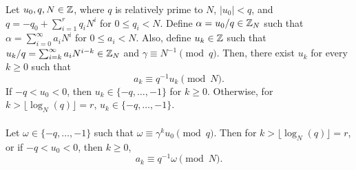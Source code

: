 \begin{theorem}\label{thm:10}
  Let $u_0,q,N\in\mathbb{Z}$, where $q$ is relatively prime to $N$,
  $\lvert u_0 \rvert < q$, and $q=-q_0+\sum_{i=1}^{r}q_iN^i$ for
  $0 \leq q_i < N$. Define $\alpha = u_0/q \in \mathbb{Z}_N$
  such that $\alpha = \sum_{i=0}^{\infty}a_iN^i$ for $0 \leq a_i < N$.
  Also, define $u_k\in\mathbb{Z}$ such that $u_k/q =
  \sum_{i=k}^{\infty}a_iN^{i-k} \in \mathbb{Z}_N$ and
  $\gamma \equiv N^{-1} \pmod q$. Then, there exist $u_k$ for every $k\geq0$
  such that
  \begin{equation}\label{eq:ak}
    a_k \equiv q^{-1}u_k \pmod N.
  \end{equation}
  If $-q<u_0<0$, then $u_k \in \{-q,\dots,-1\}$ for $k\geq0$.  Otherwise,
  for $k>\lfloor \log_N(q) \rfloor=r$, $u_k \in \{-q,\dots,-1\}$.
  \\ \\
  Let $\omega \in \{-q,\dots,-1\}$ such that $\omega \equiv
  \gamma^k u_0 \pmod q$.  Then for $k>\lfloor \log_N(q) \rfloor=r$, or if
  $-q<u_0<0$, then $k\geq0$,
  \begin{equation}\label{eq:ak-omega}
    a_k \equiv q^{-1}\omega \pmod N.
  \end{equation}
\end{theorem}
\noindent \\ 
